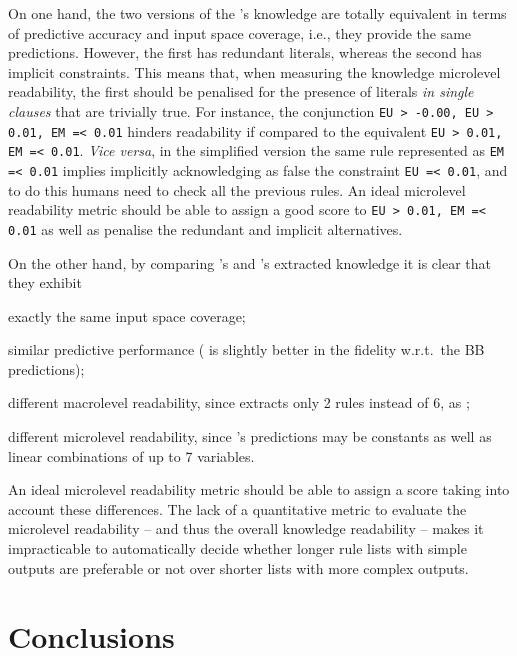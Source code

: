 \documentclass[sigconf]{acmart}
\begin{document}
On one hand, the two versions of the \cart{}'s knowledge are totally equivalent in terms of predictive accuracy and input space coverage, i.e., they provide the same predictions.
%
However, the first has redundant literals, whereas the second has implicit constraints.
%
This means that, when measuring the knowledge microlevel readability, the first should be penalised for the presence of literals \emph{in single clauses} that are trivially true.
%
For instance, the conjunction \verb|EU > -0.00, EU > 0.01, EM =< 0.01| hinders readability if compared to the equivalent \verb|EU > 0.01, EM =< 0.01|.
%
\emph{Vice versa}, in the simplified version the same rule represented as \verb|EM =< 0.01| implies implicitly acknowledging as false the constraint \verb|EU =< 0.01|, and to do this humans need to check all the previous rules.
%
An ideal microlevel readability metric should be able to assign a good score to \verb|EU > 0.01, EM =< 0.01| as well as penalise the redundant and implicit alternatives.

On the other hand, by comparing \cart{}'s and \creepy{}'s extracted knowledge it is clear that they exhibit
%
\begin{inlinelist}
	\item exactly the same input space coverage;
	\item similar predictive performance (\creepy{} is slightly better in the fidelity w.r.t.\ the BB predictions);
	\item different macrolevel readability, since \creepy{} extracts only 2 rules instead of 6, as \cart{};
	\item different microlevel readability, since \creepy{}'s predictions may be constants as well as linear combinations of up to 7 variables.
\end{inlinelist} 
%
An ideal microlevel readability metric should be able to assign a score taking into account these differences.
%
The lack of a quantitative metric to evaluate the microlevel readability -- and thus the overall knowledge readability -- makes it impracticable to automatically decide whether longer rule lists with simple outputs are preferable or not over shorter lists with more complex outputs.

\section{Conclusions}
\end{document}
